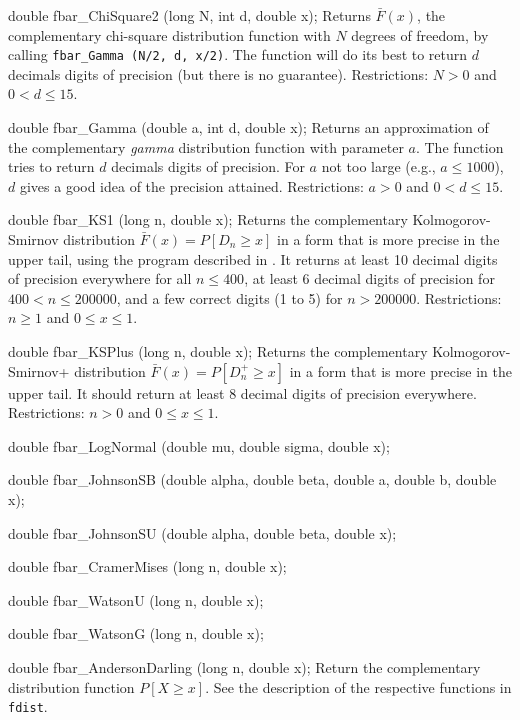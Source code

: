 double fbar_ChiSquare2 (long N, int d, double x);
\endcode
  \tab  Returns $\bar F(x)$, the complementary chi-square distribution
  function with $N$ degrees of freedom, by calling
  {\tt fbar\_Gamma (N/2, d, x/2)}.
  The function will do its best to return $d$ decimals
  digits of precision (but there is no guarantee).
  Restrictions:  $N>0$ and $0 < d \le 15$.
 \endtab
\code


double fbar_Gamma (double a, int d, double x);
\endcode
  \tab
  Returns an approximation \cite{tBAT70a} of the complementary {\em gamma\/}
  distribution function with parameter $a$.
  The function tries to return $d$ decimals digits of precision.
  For $a$ not too large (e.g., $a \le 1000$),
  $d$ gives a good idea of the precision attained.
   Restrictions:  $a>0$ and  $0 < d \le 15$.
  \endtab
\code


double fbar_KS1 (long n, double x);
\endcode
\tab Returns the complementary Kolmogorov-Smirnov distribution
$\bar F(x) = P[D_n \ge x]$ in a form that is more precise in the upper tail,
using the program described in \cite{LECz09}.
It returns at least 10 decimal digits of precision everywhere for all
 $n \le 400$,
 at least 6 decimal digits of precision for $400 < n \le 200000$,
and a few correct digits (1 to 5) for $n > 200000$.
 Restrictions:  $n\ge 1$ and $0 \le x \le 1$.
\endtab
\code


double fbar_KSPlus (long n, double x);
\endcode
\tab Returns the complementary Kolmogorov-Smirnov+ distribution
$\bar F(x) = P[D_n^+ \ge x]$ in a form that is more precise in the upper
tail. It should return at least 8 decimal digits of precision everywhere.
 Restrictions:  $n>0$ and $0 \le x \le 1$.
\endtab
\code


double fbar_LogNormal (double mu, double sigma, double x);

double fbar_JohnsonSB (double alpha, double beta, double a, double b,
                       double x);

double fbar_JohnsonSU (double alpha, double beta, double x);

double fbar_CramerMises (long n, double x);

double fbar_WatsonU (long n, double x);

double fbar_WatsonG (long n, double x);

double fbar_AndersonDarling (long n, double x);
\endcode
  \tab  Return the complementary distribution function $P[X\ge x]$.
   See the description of the respective functions in \texttt{fdist}.
 \endtab


